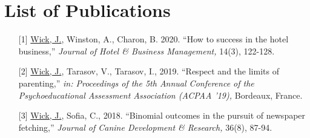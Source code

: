 \chapter*{List of Publications}

\begin{itemize}
\item[{[1]}]
\underline{Wick, J.}, Winston, A., Charon, B. 2020. 
``How to success in the hotel business,''
\emph{Journal of Hotel \& Business Management,} 14(3), 122-128.

\item[{[2]}]
\underline{Wick, J.}, Tarasov, V., Tarasov, I., 2019. 
``Respect and the limits of parenting,''
\emph{in: Proceedings of the 5th Annual Conference of the Psychoeducational Assessment Association (ACPAA '19),} Bordeaux, France.

\item[{[3]}]
\underline{Wick, J.}, Sofia, C., 2018. 
``Binomial outcomes in the pursuit of newspaper fetching,''
\emph{Journal of Canine Development \& Research,} 36(8), 87-94.

\end{itemize}

